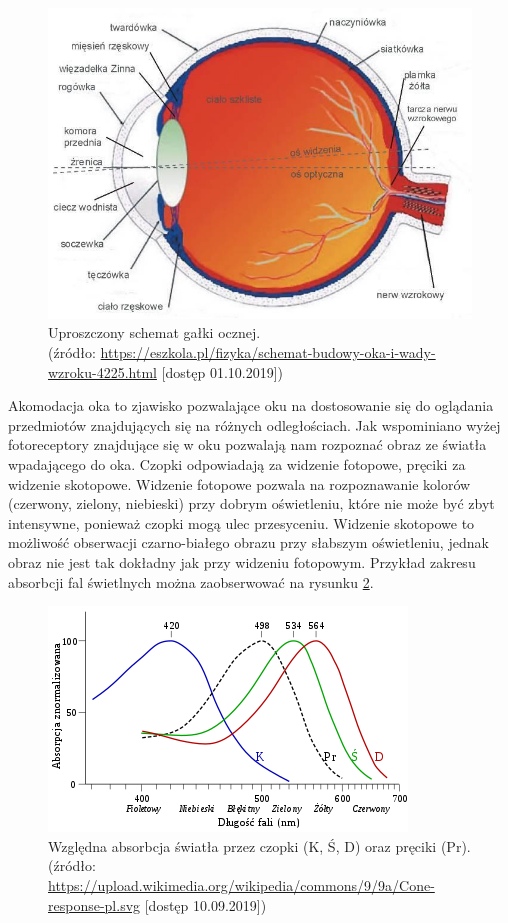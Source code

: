 \begin{figure}[H]
    \centering
    \captionsetup{justification=centering,margin=2cm}
    \includegraphics[width=0.8\linewidth]{resources/oko_galka.jpg}
    \caption[Przekrój oka.]{Uproszczony schemat gałki ocznej.\\\hspace{\textwidth} 
    \small(źródło: \url{https://eszkola.pl/fizyka/schemat-budowy-oka-i-wady-wzroku-4225.html} [dostęp 01.10.2019])}
    \label{fig:budowaoka}
\end{figure}
Akomodacja oka to zjawisko pozwalające oku na dostosowanie się do oglądania przedmiotów znajdujących się na różnych odległościach. Jak wspominiano wyżej fotoreceptory znajdujące się w oku pozwalają nam rozpoznać obraz ze światła wpadającego do oka. Czopki odpowiadają za widzenie fotopowe, pręciki za widzenie skotopowe. Widzenie fotopowe pozwala na rozpoznawanie kolorów (czerwony, zielony, niebieski) przy dobrym oświetleniu, które nie może być zbyt intensywne, ponieważ czopki mogą ulec przesyceniu. Widzenie skotopowe to możliwość obserwacji czarno-białego obrazu przy słabszym oświetleniu, jednak obraz nie jest tak dokładny jak przy widzeniu fotopowym. Przykład zakresu absorbcji fal świetlnych można zaobserwować na rysunku \ref{fig:czopki}.
\begin{figure}[H]
    \centering
    \captionsetup{justification=centering,margin=2cm}
    \includegraphics[width=0.9\linewidth]{resources/czopki.png}
    \caption[Względna absorbcja światła przez czopki oraz pręciki.]{Względna absorbcja światła przez czopki (K, Ś, D) oraz pręciki (Pr).\\\hspace{\textwidth}
    \small(źródło: \url{https://upload.wikimedia.org/wikipedia/commons/9/9a/Cone-response-pl.svg} [dostęp 10.09.2019])}
    \label{fig:czopki}
\end{figure}
